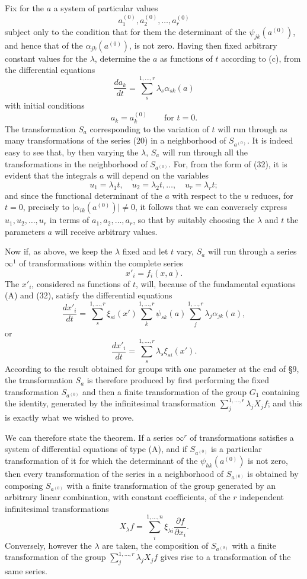 \documentclass[11pt]{book}
\begin{document}
Fix for the $a$ a system of particular values
\[
 a_1^{(0)},a_2^{(0)},\ldots,a_r^{(0)}
\]
subject only to the condition that for them the determinant of the $\psi_{jk}(a^{(0)})$, and hence that of the $\alpha_{jk}(a^{(0)})$, is not zero. Having then fixed arbitrary constant values for the $\lambda$, determine the $a$ as functions of $t$ according to (c), from the differential equations
\begin{equation*}\tag{32}
 \frac{da_k}{dt}=\sum\limits_s^{1,\ldots,r}\lambda_s\alpha_{sk}(a)
\end{equation*}
with initial conditions
\[
 a_k=a_k^{(0)}\qquad\text{for }t=0.
\]
The transformation $S_a$ corresponding to the variation of $t$ will run through as many transformations of the series (20) in a neighborhood of $S_{a^{(0)}}$. It is indeed easy to see that, by then varying the $\lambda$, $S_a$ will run through all the transformations in the neighborhood of $S_{a^{(0)}}$. For, from the form of (32), it is evident that the integrals $a$ will depend on the variables
\[
 u_1=\lambda_1t,
 \quad u_2=\lambda_2t,
 \ldots,
 \quad u_r=\lambda_rt;
\]
and since the functional determinant of the $a$ with respect to the $u$ reduces, for $t=0$, precisely to $\lvert\alpha_{ik}(a^{(0)})\rvert\ne0$, it follows that we can conversely express $u_1,u_2,\ldots,u_r$ in terms of $a_1,a_2,\ldots,a_r$, so that by suitably choosing the $\lambda$ and $t$ the parameters $a$ will receive arbitrary values.

Now if, as above, we keep the $\lambda$ fixed and let $t$ vary, $S_a$ will run through a series $\infty^1$ of transformations within the complete series
\[
 x'_i=f_i(x,a).
\]
The $x'_i$, considered as functions of $t$, will, because of the fundamental equations (A) and (32), satisfy the differential equations
\[
 \frac{dx'_i}{dt}=\sum\limits_s^{1,\ldots,r}\xi_{si}(x')\sum\limits_k^{1,\ldots,r}\psi_{sk}(a)\sum\limits_j^{1,\ldots,r}\lambda_j\alpha_{jk}(a),
\]
or
\[
 \frac{dx'_i}{dt}=\sum\limits_s^{1,\ldots,r}\lambda_s\xi_{si}(x').
\]
According to the result obtained for groups with one parameter at the end of \S{}9, the transformation $S_a$ is therefore produced by first performing the fixed transformation $S_{a^{(0)}}$ and then a finite transformation of the group $G_1$ containing the identity, generated by the infinitesimal transformation $\sum\limits_j^{1,\ldots,r}\lambda_jX_jf$; and this is exactly what we wished to prove.

We can therefore state the theorem.
If a series $\infty^r$ of transformations satisfies a system of differential equations of type (A), and if $S_{a^{(0)}}$ is a particular transformation of it for which the determinant of the $\psi_{hk}(a^{(0)})$ is not zero, then every transformation of the series in a neighborhood of $S_{a^{(0)}}$ is obtained by composing $S_{a^{(0)}}$ with a finite transformation of the group generated by an arbitrary linear combination, with constant coefficients, of the $r$ independent infinitesimal transformations
\[
 X_\lambda f=\sum\limits_i^{1,\ldots,n}\xi_{\lambda i}\frac{\partial f}{\partial x_i}.
\]
Conversely, however the $\lambda$ are taken, the composition of $S_{a^{(0)}}$ with a finite transformation of the group $\sum\limits_j^{1,\ldots,r}\lambda_jX_jf$ gives rise to a transformation of the same series.
\end{document}

